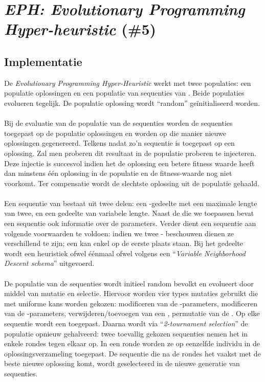 \section{\emph{EPH: Evolutionary Programming Hyper-heuristic} (\#5)}
\subsection{Implementatie}
De \emph{Evolutionary Programming Hyper-Heuristic}\cite{chesc-eph} werkt met twee populaties: een populatie oplossingen en een populatie van sequenties van \abhn{}. Beide populaties evolueren tegelijk. De populatie oplossing wordt ``random'' ge\"initialiseerd worden.

\paragraph{}
Bij de evaluatie van de populatie van de sequenties worden de sequenties toegepast op de populatie oplossingen en worden op die manier nieuwe oplossingen gegenereerd. Telkens nadat zo'n sequentie is toegepast op een oplossing. Zal men proberen dit resultaat in de populatie proberen te injecteren. Deze injectie is succesvol indien het de oplossing een betere fitness waarde heeft dan minstens \'e\'en oplossing in de populatie en de fitness-waarde nog niet voorkomt. Ter compensatie wordt de slechtste oplossing uit de populatie gehaald.

\paragraph{}
Een sequentie van \abllhn{} bestaat uit twee delen: een \abpt{}-gedeelte met een maximale lengte van twee, en een \abls{} gedeelte van variabele lengte. Naast de \abllhn{} die we toepassen bevat een sequentie ook informatie over de parameters. Verder dient een sequentie aan volgende voorwaarden te voldoen: indien we twee \abpt{}-\abhn{} beschouwen dienen ze verschillend te zijn; een \abpt{} \abh{} kan enkel op de eerste plaats staan. Bij het \abls{} gedeelte wordt een heuristiek ofwel \'e\'enmaal ofwel volgens een ``\emph{Variable Neighborhood Descent schema}''\cite{hom/vns} uitgevoerd.

\paragraph{}
De populatie van de sequenties wordt initieel random bevolkt en evolueert door middel van mutatie en selectie. Hiervoor worden vier types mutaties gebruikt die met uniforme kans worden gekozen: modificeren van de \abpt{}-parameters, modificeren van de \abls{}-parameters, verwijderen/toevoegen van een \abpt{}, permutatie van de \abls{} \abhn{}. Op elke sequentie wordt een \abmt{} toegepast. Daarna wordt via ``\emph{2-tournament selection}''\cite{Miller95geneticalgorithms} de populatie opnieuw gehalveerd: twee toevallig gekozen sequenties nemen het in enkele rondes tegen elkaar op. In een ronde worden ze op eenzelfde individu in de oplossingsverzameling toegepast. De sequentie die na de rondes het vaakst met de beste nieuwe oplossing komt, wordt geselecteerd in de nieuwe generatie van sequenties.

